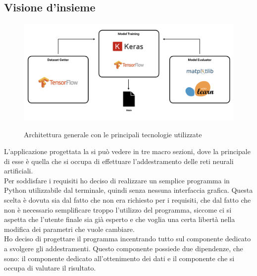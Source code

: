 \subsection{Visione d'insieme}
\begin{figure}[H]
    \centering
    \includegraphics[alt={Architettura generale con le principali tecnologie utilizzate}, width=0.9\columnwidth]{img/design.png}
    \caption{\centering Architettura generale con le principali tecnologie utilizzate}
    \label{fig:desc-proj}
\end{figure}\noindent
L'applicazione progettata la si può vedere in tre macro sezioni, dove la principale di esse è quella che si occupa di effettuare l'addestramento delle reti neurali artificiali.\\
Per soddisfare i requisiti ho deciso di realizzare un semplice programma in Python utilizzabile dal terminale, quindi senza nessuna interfaccia grafica.
Questa scelta è dovuta sia dal fatto che non era richiesto per i requisiti, che dal fatto che non è necessario semplificare troppo l'utilizzo del programma, siccome ci si aspetta che l'utente finale sia già esperto e che voglia una certa libertà nella modifica dei parametri che vuole cambiare.\\
Ho deciso di progettare il programma incentrando tutto sul componente dedicato a svolgere gli addestramenti. Questo componente possiede due dipendenze, che sono: il componente dedicato all'ottenimento dei dati e il componente che si occupa di valutare il risultato.


